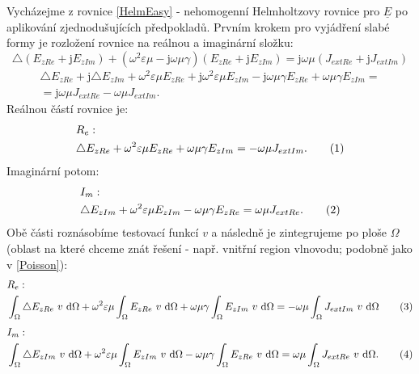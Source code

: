 \documentclass[12pt,a4paper,oneside]{article}
\numberwithin{equation}{section} %
\numberwithin{figure}{section} %
\numberwithin{table}{section} %
\newcommand{\mj}{\mathrm{j}} %
\newcommand{\faz}[1]{{\underline{#1}}} %
\newcommand\numberthis{\addtocounter{equation}{1}\tag{\theequation}}
\begin{document}
Vycházejme z rovnice \ref{HelmEasy} - nehomogenní Helmholtzovy rovnice pro $\faz{E}$ po aplikování zjednodušujících předpokladů. Prvním krokem pro vyjádření slabé formy je rozložení rovnice na reálnou a imaginární složku:
\begin{equation}
\triangle (E _{zRe} + \mj E _{zIm}) + (\omega ^2 \varepsilon \mu - \mj \omega \mu \gamma) (E _{zRe} + \mj E _{zIm}) = \mj \omega \mu (J _{extRe} + \mj J _{extIm})
\end{equation}
\begin{equation}
\begin{split}
\triangle E _{zRe} + \mj \triangle E _{zIm} + \omega ^2 \varepsilon \mu E_ {zRe} + \mj \omega ^2 \varepsilon \mu E _{zIm} - \mj \omega \mu \gamma E _{zRe} + \omega \mu \gamma E _{zIm} =\\
=\mj \omega \mu J _{extRe} - \omega \mu J _{extIm} .
\end{split}
\end{equation}
Reálnou částí rovnice je:
\begin{align*}
&R_{e}:
\\
&\triangle E_ {zRe} + \omega ^2 \varepsilon \mu E_ {zRe} + \omega \mu \gamma E _{zIm} = - \omega \mu J _{extIm} .
\numberthis
\end{align*}
Imaginární potom:
\begin{align*}
&I_{m}:
\\
&\triangle E _{zIm} + \omega ^2 \varepsilon \mu E _{zIm} - \omega \mu \gamma E _{zRe} = \omega \mu J _{extRe} .
\numberthis
\end{align*}
Obě části roznásobíme testovací funkcí $v$ a následně je  zintegrujeme po ploše $\Omega$ (oblast na které chceme znát řešení - např. vnitřní region vlnovodu; podobně jako v \ref{Poisson}):
\begin{align*}
&R_e:
\\
&\int _{\Omega} \triangle E _{zRe} ~ v ~ \ud \Omega + \omega ^2 \varepsilon \mu \int _{\Omega} E _{zRe} ~ v ~ \ud \Omega + \omega \mu \gamma \int _{\Omega} E _{zIm} ~ v ~ \ud \Omega = - \omega \mu \int _{\Omega} J _{extIm} ~ v ~ \ud \Omega
\numberthis
\end{align*}
\begin{align*}
&I_m:
\\
&\int _{\Omega} \triangle E _{zIm} ~ v ~ \ud \Omega + \omega ^2 \varepsilon \mu \int _{\Omega} E _{zIm} ~ v ~ \ud \Omega - \omega \mu \gamma \int _{\Omega} E _{zRe} ~ v ~ \ud \Omega = \omega \mu \int _{\Omega} J _{extRe} ~ v ~ \ud \Omega .
\numberthis
\end{align*}
\end{document}
